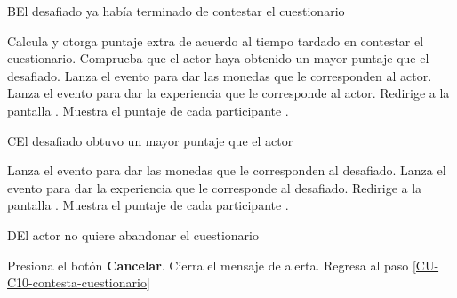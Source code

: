 \begin{UCtrayectoriaA}%
  {B}{El  desafiado ya había terminado de contestar el cuestionario}

  \Sistema Calcula y otorga puntaje extra de acuerdo al tiempo tardado en contestar el cuestionario.
  \Sistema Comprueba que el actor haya obtenido un mayor puntaje que el  desafiado. 
  \Sistema Lanza el evento para dar las monedas que le corresponden al actor.
  \Sistema Lanza el evento para dar la experiencia que le corresponde al actor.
  \Sistema Redirige a la pantalla .
  \Sistema Muestra el puntaje de cada participante .

\end{UCtrayectoriaA}

\begin{UCtrayectoriaA}%
  {C}{El  desafiado obtuvo un mayor puntaje que el actor}

  \Sistema Lanza el evento para dar las monedas que le corresponden al  desafiado.
  \Sistema Lanza el evento para dar la experiencia que le corresponde al  desafiado.
  \Sistema Redirige a la pantalla .
  \Sistema Muestra el puntaje de cada participante .

\end{UCtrayectoriaA}

\begin{UCtrayectoriaA}{D}{El actor no quiere abandonar el cuestionario}

  \Actor Presiona el botón {\bf Cancelar}.
  \Sistema Cierra el mensaje de alerta.
  \Sistema Regresa al paso \ref{CU-C10-contesta-cuestionario}

\end{UCtrayectoriaA}
